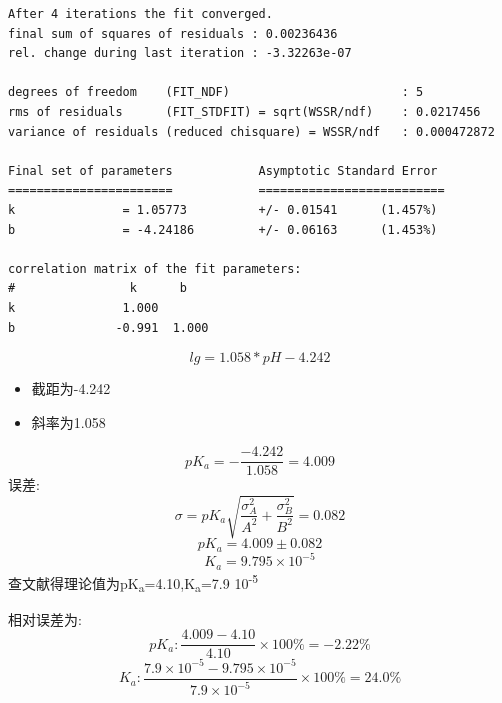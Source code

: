 \documentclass[11pt]{report}
\begin{document}
\begin{enumerate}
\begin{verbatim}
After 4 iterations the fit converged.
final sum of squares of residuals : 0.00236436
rel. change during last iteration : -3.32263e-07

degrees of freedom    (FIT_NDF)                        : 5
rms of residuals      (FIT_STDFIT) = sqrt(WSSR/ndf)    : 0.0217456
variance of residuals (reduced chisquare) = WSSR/ndf   : 0.000472872

Final set of parameters            Asymptotic Standard Error
=======================            ==========================
k               = 1.05773          +/- 0.01541      (1.457%)
b               = -4.24186         +/- 0.06163      (1.453%)

correlation matrix of the fit parameters:
#                k      b      
k               1.000 
b              -0.991  1.000 

\end{verbatim}
\[
lg=1.058*pH-4.242
\]
\begin{itemize}
\item 截距为-4.242
\item 斜率为1.058
\end{itemize}
\[
pK_{a}=-\frac{-4.242}{1.058}=4.009
\]
误差:
\[
\sigma=pK_{a}\sqrt{\frac{\sigma_{A}^{2}}{A^{2}}+\frac{\sigma_{B}^{2}}{B^{2}}}=0.082
\]
\[
pK_{a}=4.009\pm 0.082
\]
\[
K_{a}=9.795\times 10^{-5}
\]
查文献得理论值为pK\textsubscript{a}=4.10,K\textsubscript{a}=7.9\texttimes{} 10\textsuperscript{-5}

相对误差为:
\[
pK_{a}: \frac{4.009-4.10}{4.10}\times 100\% =-2.22\%
\]
\[
K_{a}: \frac{7.9\times 10^{-5}-9.795\times 10^{-5}}{7.9\times 10^{-5}}\times 100\%=24.0\%
\]
\end{enumerate}
\end{document}
